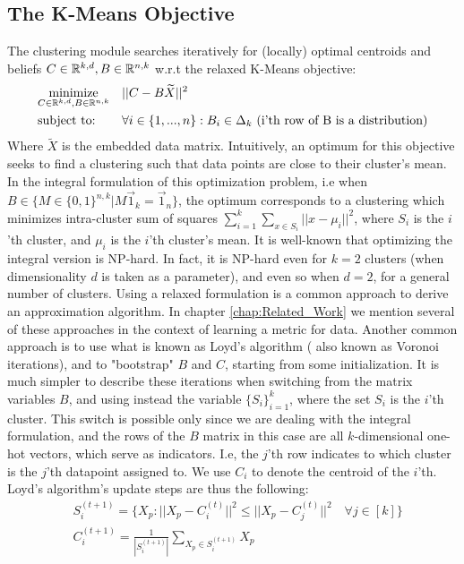 \subsection{The K-Means Objective}
The clustering module searches iteratively for (locally) optimal centroids and beliefs $C\in \mathbb{R}^{k,d},B\in\mathbb{R}^{n,k}$ w.r.t the relaxed K-Means objective:
\begin{equation*}
\begin{aligned}
& \underset{C\in \mathbb{R}^{k,d},B\in\mathbb{R}^{n,k}}{\text{minimize}}
& & ||C-B\widetilde{X}||^2 \\
& \text{subject to:}
& & \forall i\in\{1,...,n\}: B_i \in \Delta_k \text{ (i'th row of B is a distribution)}
\end{aligned}
\end{equation*}
Where $\widetilde{X}$ is the embedded data matrix.
Intuitively, an optimum for this objective seeks to find a clustering such that data points are close to their cluster's mean.
In the integral formulation of this optimization problem, i.e when $B\in \{M\in\{0,1\}^{n,k}|M\vec{1}_k = \vec{1}_n\}$, the optimum corresponds to a clustering which minimizes intra-cluster sum of squares $\sum_{i=1}^{k}\sum_{x\in S_i}{||x-\mu_i||^2}$, where $S_i$ is the $i$'th cluster, and $\mu_i$ is the $i$'th cluster's mean.
It is well-known that optimizing the integral version is NP-hard. In fact, it is NP-hard even for $k=2$ clusters (when dimensionality $d$ is taken as a parameter), and even so when $d=2$, for a general number of clusters.
Using a relaxed formulation is a common approach to derive an approximation algorithm. In chapter \ref{chap:Related_Work} we mention several of these approaches in the context of learning a metric for data.
Another common approach is to use what is known as Loyd's algorithm ( also known as Voronoi iterations), and to "bootstrap" $B$ and $C$, starting from some initialization. It is much simpler to describe these iterations when switching from the matrix variables $B$, and using instead the variable $\{S_i\}_{i=1}^{k}$, where the set $S_i$ is the $i$'th cluster. This switch is possible only since we are dealing with the integral formulation, and the rows of the $B$ matrix in this case are all $k$-dimensional one-hot vectors, which serve as indicators. I.e, the $j$'th row indicates to which cluster is the $j$'th datapoint assigned to. 
We use $C_i$ to denote the centroid of the $i$'th.
Loyd's algorithm's update steps are thus the following:
\begin{equation*} 
\begin{aligned}
& S_{i}^{(t+1)}= \{X_p : ||X_p-C_{i}^{(t)}||^2\leq||X_p-C_{j}^{(t)}||^2 \quad \forall j\in[k] \} \\
& C_{i}^{(t+1)}= \frac{1}{|S_i^{(t+1)}|}\sum_{X_p\in S_i^{(t+1)}}{X_p}
\end{aligned}
\end{equation*}
